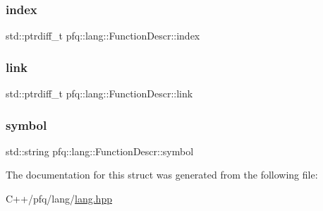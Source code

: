 \subsubsection{\texorpdfstring{index}{index}}
{\footnotesize\ttfamily std\+::ptrdiff\+\_\+t pfq\+::lang\+::\+Function\+Descr\+::index}

\mbox{\label{structpfq_1_1lang_1_1FunctionDescr_a09e00f9d57300893f95661b56e6b114e}} 
\subsubsection{\texorpdfstring{link}{link}}
{\footnotesize\ttfamily std\+::ptrdiff\+\_\+t pfq\+::lang\+::\+Function\+Descr\+::link}

\mbox{\label{structpfq_1_1lang_1_1FunctionDescr_a21f51c65f55dddd54de1171d8914c030}} 
\subsubsection{\texorpdfstring{symbol}{symbol}}
{\footnotesize\ttfamily std\+::string pfq\+::lang\+::\+Function\+Descr\+::symbol}



The documentation for this struct was generated from the following file\+:\begin{DoxyCompactItemize}
\item 
C++/pfq/lang/\hyperlink{lang_8hpp}{lang.\+hpp}\end{DoxyCompactItemize}
